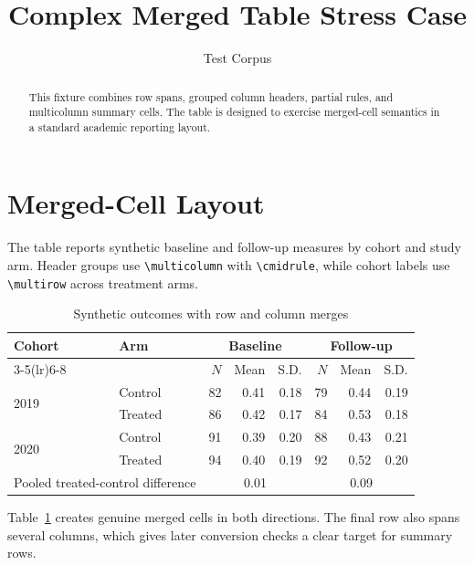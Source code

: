 \documentclass[11pt]{article}
\title{Complex Merged Table Stress Case}
\author{Test Corpus}
\date{}
\begin{document}
\maketitle

\begin{abstract}
This fixture combines row spans, grouped column headers, partial rules, and
multicolumn summary cells. The table is designed to exercise merged-cell
semantics in a standard academic reporting layout.
\end{abstract}

\section{Merged-Cell Layout}
\label{sec:merged-layout}

The table reports synthetic baseline and follow-up measures by cohort and study
arm. Header groups use \texttt{\textbackslash multicolumn} with
\texttt{\textbackslash cmidrule}, while cohort labels use
\texttt{\textbackslash multirow} across treatment arms.

\begin{table}[htbp]
\centering
\caption{Synthetic outcomes with row and column merges}
\label{tab:complex-merge}
\begin{tabular}{llrrrrrr}
\toprule
\multirow{2}{*}{Cohort} & \multirow{2}{*}{Arm} & \multicolumn{3}{c}{Baseline} & \multicolumn{3}{c}{Follow-up} \\
\cmidrule(lr){3-5}\cmidrule(lr){6-8}
 &  & $N$ & Mean & S.D. & $N$ & Mean & S.D. \\
\midrule
\multirow{2}{*}{2019}
  & Control & 82 & 0.41 & 0.18 & 79 & 0.44 & 0.19 \\
  & Treated & 86 & 0.42 & 0.17 & 84 & 0.53 & 0.18 \\
\midrule
\multirow{2}{*}{2020}
  & Control & 91 & 0.39 & 0.20 & 88 & 0.43 & 0.21 \\
  & Treated & 94 & 0.40 & 0.19 & 92 & 0.52 & 0.20 \\
\midrule
\multicolumn{2}{l}{Pooled treated-control difference}
  & \multicolumn{3}{c}{0.01} & \multicolumn{3}{c}{0.09} \\
\bottomrule
\end{tabular}
\end{table}

Table~\ref{tab:complex-merge} creates genuine merged cells in both directions.
The final row also spans several columns, which gives later conversion checks a
clear target for summary rows.
\end{document}
